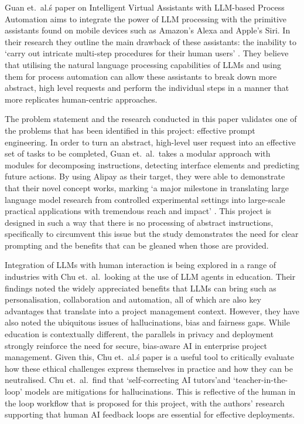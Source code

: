 \documentclass{report}
\begin{document}
Guan et.\ al.\'s paper on Intelligent Virtual Assistants with LLM-based Process Automation aims to integrate the power of LLM processing with the primitive assistants found on mobile devices such as Amazon's Alexa and Apple's Siri. 
In their research they outline the main drawback of these assistants: the inability to `carry out intricate multi-step procedures for their human users' \parencite{guanIntelligentVirtualAssistants2023}. 
They believe that utilising the natural language processing capabilities of LLMs and using them for process automation can allow these assistants to break down more abstract, high level requests and perform the individual steps in a manner that more replicates human-centric approaches.

The problem statement and the research conducted in this paper validates one of the problems that has been identified in this project: effective prompt engineering. 
In order to turn an abstract, high-level user request into an effective set of tasks to be completed, Guan et.\ al.\ takes a modular approach with modules for decomposing instructions, detecting interface elements and predicting future actions. 
By using Alipay as their target, they were able to demonstrate that their novel concept works, marking `a major milestone in translating large language model research from controlled experimental settings into large-scale practical applications with tremendous reach and impact' \parencite{guanIntelligentVirtualAssistants2023}. 
This project is designed in such a way that there is no processing of abstract instructions, specifically to circumvent this issue but the study demonstrates the need for clear prompting and the benefits that can be gleaned when those are provided.

Integration of LLMs with human interaction is being explored in a range of industries with Chu et.\ al.\ looking at the use of LLM agents in education. 
Their findings noted the widely appreciated benefits that LLMs can bring such as personalisation, collaboration and automation, all of which are also key advantages that translate into a project management context. 
However, they have also noted the ubiquitous issues of hallucinations, bias and fairness gaps. 
While education is contextually different, the parallels in privacy and deployment strongly reinforce the need for secure, bias-aware AI in enterprise project management. 
Given this, Chu et.\ al.\'s paper is a useful tool to critically evaluate how these ethical challenges express themselves in practice and how they can be neutralised. 
Chu et.\ al.\ find that `self-correcting AI tutors'and `teacher-in-the-loop' models are mitigations for hallucinations. 
This is reflective of the human in the loop workflow that is proposed for this project, with the authors' research supporting that human AI feedback loops are essential for effective deployments.
\end{document}
